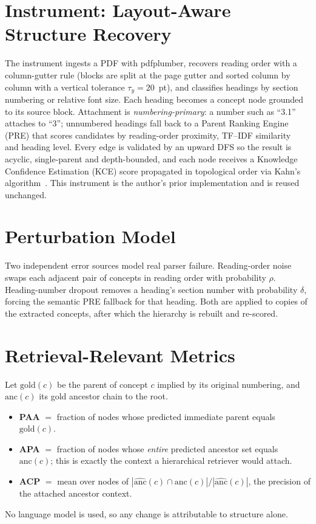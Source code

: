 \documentclass[12pt,a4paper]{report}
\begin{document}
\section{Instrument: Layout-Aware Structure Recovery}
The instrument ingests a PDF with pdfplumber, recovers reading order with a column-gutter rule
(blocks are split at the page gutter and sorted column by column with a vertical tolerance
$\tau_y=20$~pt), and classifies headings by section numbering or relative font size. Each heading
becomes a concept node grounded to its source block. Attachment is \emph{numbering-primary}: a
number such as ``3.1'' attaches to ``3''; unnumbered headings fall back to a Parent Ranking Engine
(PRE) that scores candidates by reading-order proximity, TF--IDF similarity~\cite{salton1983introduction}
and heading level. Every edge is validated by an upward DFS so the result is acyclic, single-parent
and depth-bounded, and each node receives a Knowledge Confidence Estimation (KCE) score propagated
in topological order via Kahn's algorithm~\cite{kahn1962topological}. This instrument is the author's
prior implementation and is reused unchanged.

\section{Perturbation Model}
Two independent error sources model real parser failure. Reading-order noise swaps each adjacent pair
of concepts in reading order with probability $\rho$. Heading-number dropout removes a heading's
section number with probability $\delta$, forcing the semantic PRE fallback for that heading. Both
are applied to copies of the extracted concepts, after which the hierarchy is rebuilt and re-scored.

\section{Retrieval-Relevant Metrics}
Let $\mathrm{gold}(c)$ be the parent of concept $c$ implied by its original numbering, and
$\mathrm{anc}(c)$ its gold ancestor chain to the root.
\begin{itemize}
  \item \textbf{PAA} $=$ fraction of nodes whose predicted immediate parent equals $\mathrm{gold}(c)$.
  \item \textbf{APA} $=$ fraction of nodes whose \emph{entire} predicted ancestor set equals
  $\mathrm{anc}(c)$; this is exactly the context a hierarchical retriever would attach.
  \item \textbf{ACP} $=$ mean over nodes of
  $|\widehat{\mathrm{anc}}(c)\cap\mathrm{anc}(c)| / |\widehat{\mathrm{anc}}(c)|$, the precision of the
  attached ancestor context.
\end{itemize}
No language model is used, so any change is attributable to structure alone.
\end{document}
